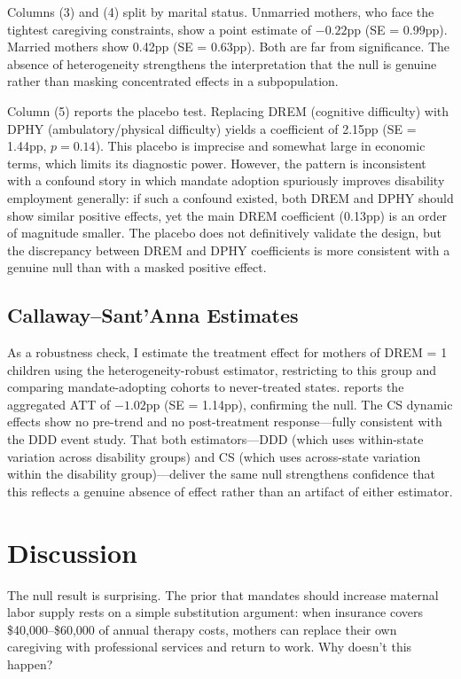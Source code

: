 \documentclass[12pt]{article}
\begin{document}
Columns (3) and (4) split by marital status. Unmarried mothers, who face the tightest caregiving constraints, show a point estimate of $-0.22$pp (SE = 0.99pp). Married mothers show 0.42pp (SE = 0.63pp). Both are far from significance. The absence of heterogeneity strengthens the interpretation that the null is genuine rather than masking concentrated effects in a subpopulation.

Column (5) reports the placebo test. Replacing DREM (cognitive difficulty) with DPHY (ambulatory/physical difficulty) yields a coefficient of 2.15pp (SE = 1.44pp, $p = 0.14$). This placebo is imprecise and somewhat large in economic terms, which limits its diagnostic power. However, the pattern is inconsistent with a confound story in which mandate adoption spuriously improves disability employment generally: if such a confound existed, both DREM and DPHY should show similar positive effects, yet the main DREM coefficient (0.13pp) is an order of magnitude smaller. The placebo does not definitively validate the design, but the discrepancy between DREM and DPHY coefficients is more consistent with a genuine null than with a masked positive effect.

\subsection{Callaway--Sant'Anna Estimates}



As a robustness check, I estimate the treatment effect for mothers of DREM = 1 children using the \citet{callaway2021} heterogeneity-robust estimator, restricting to this group and comparing mandate-adopting cohorts to never-treated states.  reports the aggregated ATT of $-1.02$pp (SE = 1.14pp), confirming the null. The CS dynamic effects show no pre-trend and no post-treatment response---fully consistent with the DDD event study. That both estimators---DDD (which uses within-state variation across disability groups) and CS (which uses across-state variation within the disability group)---deliver the same null strengthens confidence that this reflects a genuine absence of effect rather than an artifact of either estimator.


\section{Discussion}

The null result is surprising. The prior that mandates should increase maternal labor supply rests on a simple substitution argument: when insurance covers \$40,000--\$60,000 of annual therapy costs, mothers can replace their own caregiving with professional services and return to work. Why doesn't this happen?
\end{document}
